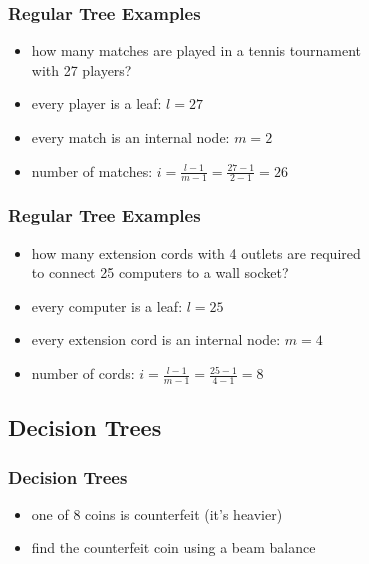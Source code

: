 \documentclass[dvipsnames]{beamer}
\begin{document}
\begin{frame}
  \frametitle{Regular Tree Examples}

  \begin{example}
    \begin{itemize}
      \item how many matches are played in a tennis tournament\\
        with 27 players?

      \pause
      \bigskip
      \item every player is a leaf: $l = 27$
      \item every match is an internal node: $m = 2$
      \item number of matches: $i = \frac{l - 1}{m - 1} = \frac{27 - 1}{2 - 1} = 26$
    \end{itemize}
  \end{example}
\end{frame}

\begin{frame}
  \frametitle{Regular Tree Examples}

  \begin{example}
    \begin{itemize}
      \item how many extension cords with 4 outlets are required\\
        to connect 25 computers to a wall socket?

      \pause
      \bigskip
      \item every computer is a leaf: $l = 25$
      \item every extension cord is an internal node: $m = 4$
      \item number of cords: $i = \frac{l - 1}{m - 1} = \frac{25 - 1}{4 - 1} = 8$
    \end{itemize}
  \end{example}
\end{frame}

\subsection{Decision Trees}


\begin{frame}
  \frametitle{Decision Trees}

  \begin{example}
    \begin{itemize}
      \item one of 8 coins is counterfeit (it's heavier)
      \item find the counterfeit coin using a beam balance
    \end{itemize}
  \end{example}
\end{frame}
\end{document}
